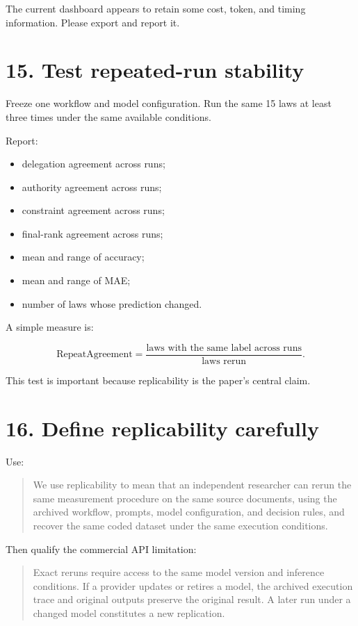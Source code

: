 \documentclass[11pt]{article}
\begin{document}
The current dashboard appears to retain some cost, token, and timing information. Please export and report it.

\section*{15. Test repeated-run stability}

Freeze one workflow and model configuration. Run the same 15 laws at least three times under the same available conditions.

Report:

\begin{itemize}
    \item delegation agreement across runs;
    \item authority agreement across runs;
    \item constraint agreement across runs;
    \item final-rank agreement across runs;
    \item mean and range of accuracy;
    \item mean and range of MAE;
    \item number of laws whose prediction changed.
\end{itemize}

A simple measure is:

\[
\mathrm{RepeatAgreement}
=
\frac{\text{laws with the same label across runs}}
{\text{laws rerun}}.
\]

This test is important because replicability is the paper's central claim.

\section*{16. Define replicability carefully}

Use:

\begin{quote}
We use replicability to mean that an independent researcher can rerun the same measurement procedure on the same source documents, using the archived workflow, prompts, model configuration, and decision rules, and recover the same coded dataset under the same execution conditions.
\end{quote}

Then qualify the commercial API limitation:

\begin{quote}
Exact reruns require access to the same model version and inference conditions. If a provider updates or retires a model, the archived execution trace and original outputs preserve the original result. A later run under a changed model constitutes a new replication.
\end{quote}
\end{document}
